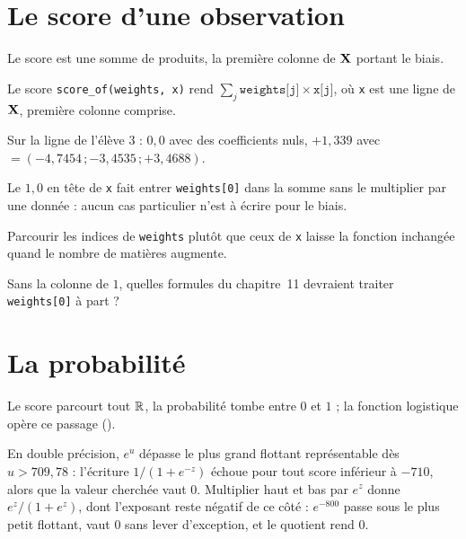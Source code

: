 \section{Le score d'une observation}

Le score est une somme de produits, la première colonne de $\mathbf{X}$ portant le biais.

\begin{tache}{Le score}
 \texttt{score\_of(weights, x)} rend
$\sum_j \texttt{weights[j]}\times\texttt{x[j]}$, où \texttt{x} est une ligne de
$\mathbf{X}$, première colonne comprise.

 Sur la ligne de l'élève $3$ : $0{,}0$ avec des coefficients nuls,
$+1{,}339$ avec \Mquatre $=(-4{,}7454\,;-3{,}4535\,;+3{,}4688)$.

 Le $1{,}0$ en tête de \texttt{x} fait entrer \texttt{weights[0]}
dans la somme sans le multiplier par une donnée : aucun cas particulier n'est à
écrire pour le biais.

 Parcourir les indices de \texttt{weights} plutôt que ceux de
\texttt{x} laisse la fonction inchangée quand le nombre de matières augmente.

 Sans la colonne de $1$, quelles formules du chapitre~11
devraient traiter \texttt{weights[0]} à part ?
\end{tache}

\section{La probabilité}

Le score parcourt tout $\mathbb{R}$, la probabilité tombe entre $0$ et $1$ ; la fonction
logistique opère ce passage ().

En double précision, $e^{u}$ dépasse le plus grand flottant représentable dès
$u>709{,}78$ : l'écriture $1/(1+e^{-z})$ échoue pour tout score inférieur à
$-710$, alors que la valeur cherchée vaut $0$. Multiplier haut et bas par $e^{z}$
donne $e^{z}/(1+e^{z})$, dont l'exposant reste négatif de ce côté : $e^{-800}$
passe sous le plus petit flottant, vaut $0$ sans lever d'exception, et le
quotient rend $0$.

